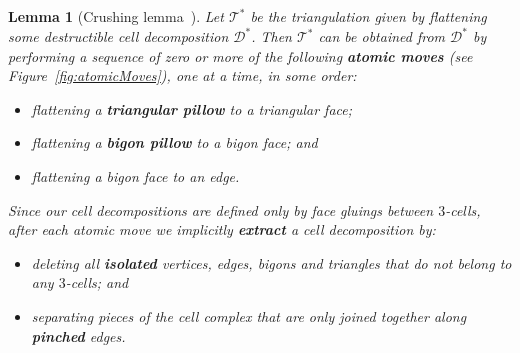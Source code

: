 \documentclass[10pt,a4paper]{amsart}
\newtheorem{lemma}[theorem]{Lemma}
\newcommand{\tri}{\mathcal{T}}
\begin{document}
\begin{lemma}[Crushing lemma~{\cite[Lemma~3]{burton2014crushing}}]\label{lem:benCrushing}
Let $\tri^\ast$ be the triangulation given by flattening some destructible cell decomposition $\mathcal{D}^\ast$.
Then $\tri^\ast$ can be obtained from $\mathcal{D}^\ast$ by performing a sequence of
zero or more of the following \textbf{atomic moves} (see Figure~\ref{fig:atomicMoves}), one at a time, in some order:
\begin{itemize}
    \item flattening a \textbf{triangular pillow} to a triangular face;
    \item flattening a \textbf{bigon pillow} to a bigon face; and
    \item flattening a bigon face to an edge.
\end{itemize}
Since our cell decompositions are defined only by face gluings between $3$-cells,
after each atomic move we implicitly \textbf{extract} a cell decomposition by:
\begin{itemize}
    \item deleting all \textbf{isolated} vertices, edges, bigons and triangles that do not belong to any $3$-cells; and
    \item separating pieces of the cell complex that are only joined together along
    \textbf{pinched} edges.
\end{itemize}
\end{lemma}
\end{document}
